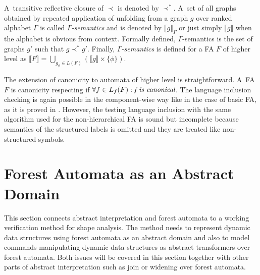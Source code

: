 \documentclass[a4paper, 12pt]{article}
\begin{document}
A~transitive reflective closure of $\prec$ is denoted by $\prec^*$.
A~set of all graphs obtained by repeated application of unfolding from
a graph $g$ over ranked alphabet $\Gamma$ is called \emph{$\Gamma$-semantics}
and is denoted by $\llbracket g \rrbracket_\Gamma$ or just simply $\llbracket g \rrbracket$ when
the alphabet is obvious from context.
Formally defined, $\Gamma$-semantics is the set of graphs $g'$ such that $g \prec^* g'$.
Finally, \emph{$\Gamma$-semantics} is defined for a FA $F$ of higher level as
$\llbracket F \rrbracket = \bigcup_{g_\phi \in L(F)} (\llbracket g \rrbracket \times \{\phi\})$.

The extension of canonicity to automata of higher level is straightforward.
A~FA $F$ is canonicity respecting if $\forall f \in L_f(F): \emph{f is canonical}$.
The language inclusion checking is again possible in the component-wise way like in the case of basic FA,
as it is proved in \cite{cav11}.
However, the testing language inclusion with the same algorithm used for the non-hierarchical FA
is sound but incomplete because semantics of the structured labels is omitted
and they are treated like non-structured symbols.

\section{Forest Automata as an Abstract Domain}
\label{sec:analysis}

This section connects abstract interpretation
and forest automata to a working verification method for shape analysis.
The method needs to represent dynamic data structures
using forest automata as an abstract domain and
also to model commands manipulating dynamic data structures
as abstract transformers over forest automata.
Both issues will be covered in this section together with
other parts of abstract interpretation such as join or widening
over forest automata.
\end{document}
